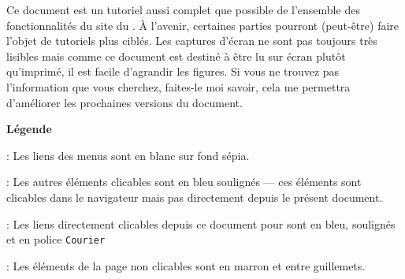 
\thispagestyle{empty}
\begin{tcolorbox}[colframe=Bittersweet!50!black,title=À propos de ce document]
    Ce document est un tutoriel aussi complet que possible de l’ensemble des fonctionnalités du site \CF{} du \CdS.  À l'avenir, certaines parties pourront (peut-être) faire l'objet de tutoriels plus ciblés.
    \aster
    Les captures d'écran ne sont pas toujours très lisibles mais comme ce document est destiné à être lu sur écran plutôt qu'imprimé, il est facile d'agrandir les figures.
    \aster
    Si vous ne trouvez pas l’information que vous cherchez, faites-le moi savoir, cela me permettra d’améliorer les prochaines versions du document.
\end{tcolorbox}

\vfill

\noindent
{\Large\textbf{Légende}}

\medskip
\noindent
{}: Les liens des menus sont en blanc sur fond sépia.

\noindent
{}: Les autres éléments clicables sont en bleu soulignés --- ces éléments sont clicables dans le navigateur mais pas directement depuis le présent document.

\noindent
{}: Les liens directement clicables depuis ce document pour sont en bleu, soulignés et en police \texttt{Courier}

\noindent
{}: Les éléments de la page non clicables sont en marron et entre guillemets.

